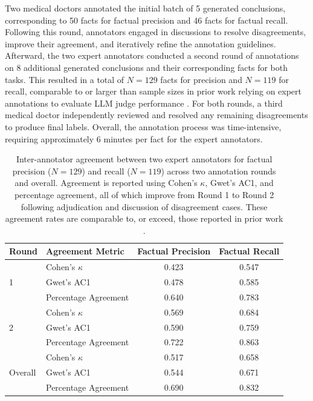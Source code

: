 \documentclass{article}
\begin{document}
Two medical doctors annotated the initial batch of 5 generated conclusions, corresponding to 50 facts for factual precision and 46 facts for factual recall. Following this round, annotators engaged in discussions to resolve disagreements, improve their agreement, and iteratively refine the annotation guidelines. Afterward, the two expert annotators conducted a second round of annotations on 8 additional generated conclusions and their corresponding facts for both tasks. This resulted in a total of $N=129$ facts for precision and $N=119$ for recall, comparable to or larger than sample sizes in prior work relying on expert annotations to evaluate LLM judge performance  \cite{cheng2025facts, 10.1093/jla/laae003, dammu-etal-2024-uncultured, jung-etal-2025-mythtriage, phutane2025ableistintersectionaldisabilitybias}. For both rounds, a third medical doctor independently reviewed and resolved any remaining disagreements to produce final labels. Overall, the annotation process was time-intensive, requiring approximately 6 minutes per fact for the expert annotators.

\begin{table}[t]
\centering
\small
\caption{Inter-annotator agreement between two expert annotators for factual precision ($N=129$) and recall ($N=119$) across two annotation rounds and overall. Agreement is reported using Cohen’s $\kappa$, Gwet’s AC1, and percentage agreement, all of which improve from Round 1 to Round 2 following adjudication and discussion of disagreement cases. These agreement rates are comparable to, or exceed, those reported in prior work \cite{cheng2025facts, liu-etal-2025-verifact, min-etal-2023-factscore}.}
\begin{tabular}{l l c c}
\toprule
\textbf{Round} & \textbf{Agreement Metric} & \textbf{Factual Precision} & \textbf{Factual Recall} \\
\midrule
\multirow{3}{*}{1}
& Cohen's $\kappa$ & 0.423 & 0.547 \\
& Gwet's AC1 & 0.478 & 0.585 \\
& Percentage Agreement & 0.640 & 0.783 \\
\midrule
\multirow{3}{*}{2}
& Cohen's $\kappa$ & 0.569 & 0.684 \\
& Gwet's AC1 & 0.590 & 0.759 \\
& Percentage Agreement & 0.722 & 0.863 \\
\midrule
\multirow{3}{*}{Overall}
& Cohen's $\kappa$ & 0.517 & 0.658 \\
& Gwet's AC1 & 0.544 & 0.671 \\
& Percentage Agreement & 0.690 & 0.832 \\
\bottomrule
\end{tabular}
\label{tab:iaa-fact-eval}
\end{table}
\end{document}
